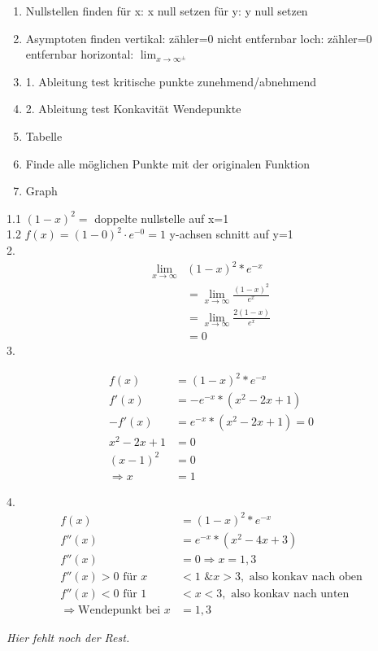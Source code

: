 \documentclass{book}
\begin{document}
\begin{multicols}{2}

\begin{tcolorbox}[colback=blue!10!white,colframe=green!50!black,title=Schritte zum Skizzieren]
\begin{enumerate}
  \item Nullstellen finden
    \subitem f\"ur x: x null setzen
    \subitem f\"ur y: y null setzen
  \item Asymptoten finden
    \subitem vertikal: z\"ahler=0 nicht entfernbar
    \subitem loch: z\"ahler=0 entfernbar
    \subitem horizontal: $\lim_{x \to \infty^\pm}$
  \item 1. Ableitung test
    \subitem kritische punkte
    \subitem zunehmend/abnehmend
  \item 2. Ableitung test
    \subitem Konkavität
    \subitem Wendepunkte
  \item Tabelle
  \item Finde alle m\"oglichen Punkte mit der originalen Funktion
  \item Graph
\end{enumerate}
\end{tcolorbox}

1.1 $(1-x)^2 =$ doppelte nullstelle auf x=1\\
1.2 $f(x)=(1-0)^2\cdot e^{-0} = 1$ y-achsen schnitt auf y=1\\
2. 
\begin{align*}
\lim_{x \to \infty}&(1-x)^2 * e^{-x} \\
                   &= \lim_{x \to \infty} \frac{(1-x)^2}{e^x} \\
&= \lim_{x \to \infty} \frac{2(1-x)}{e^x} \\
&= 0
\end{align*}
3. 

\begin{align*}
f(x) &= (1-x)^2 * e^{-x} \\
f'(x) &= -e^{-x}*(x^2-2x+1) \\
-f'(x) &= e^{-x}*(x^2-2x+1) = 0 \\
x^2 - 2x + 1 &= 0 \\
(x-1)^2 &= 0 \\
\Rightarrow x &= 1
\end{align*}

4. 
\begin{align*}
f(x) &= (1-x)^2 * e^{-x} \\
f''(x) &= e^{-x}*(x^2-4x+3) \\
f''(x) &= 0 \Rightarrow x = 1, 3 \\
f''(x) > 0 \text{ für } x& < 1 \text{ \& } x > 3, \text{ also konkav nach oben} \\
f''(x) < 0 \text{ für } 1& < x < 3, \text{ also konkav nach unten} \\
\Rightarrow \text{Wendepunkt bei } x &= 1, 3
\end{align*}

\textit{Hier fehlt noch der Rest.}
\end{multicols}
\end{document}
